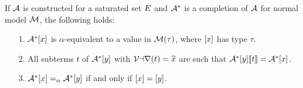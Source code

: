 \begin{lemma}
\label{lem:model-completion}
If $\mathcal{A}$ is constructed for a saturated set $E$
and $\mathcal{A}^\ast$ is a completion of $\mathcal{A}$ for normal model $\mathcal{M}$, the following holds:
\begin{enumerate}
\item[\rm 1.] $\mathcal{A}^\ast [x]$ is $\alpha$-equivalent to a value in $\mathcal{M}( \tau )$, where $[x]$ has type $\tau$.
\item[\rm 2.]
All subterms $t$ of $\mathcal{A}^\ast [y]$ with $\mathcal{Var}(t) = {\widetilde{x}}$ are such that
$\mathcal{A}^\ast [y] \llbracket  t  \rrbracket = \mathcal{A}^\ast [x]$. 
\item[\rm 3.]
$\mathcal{A}^\ast [x] \mathrel{=_\alpha} \mathcal{A}^\ast [y]$ if and only if $[x] = [y]$.
\end{enumerate}
\end{lemma}

